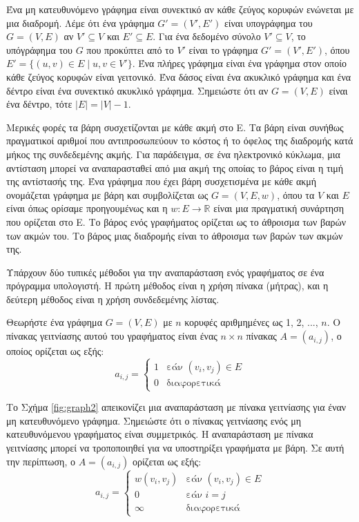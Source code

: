 \documentclass[12pt,a4paper]{article} %
\begin{document}
Ένα μη κατευθυνόμενο γράφημα είναι συνεκτικό αν κάθε ζεύγος κορυφών ενώνεται με μια διαδρομή. Λέμε ότι ένα γράφημα $G' = (V', E')$ είναι υπογράφημα του $G = (V, E)$ αν $V'\subseteq V$ και $E'\subseteq E$. Για ένα δεδομένο σύνολο $V'\subseteq V$, το υπόγράφημα του $G$ που προκύπτει από το $V'$ είναι το γράφημα $G' = (V', E')$, όπου $E' = \{ (u, v) \in E \mid u, v \in V' \}$. Ένα πλήρες γράφημα είναι ένα γράφημα στον οποίο κάθε ζεύγος κορυφών είναι γειτονικό. Ένα δάσος είναι ένα ακυκλικό γράφημα και ένα δέντρο είναι ένα συνεκτικό ακυκλικό γράφημα. Σημειώστε ότι αν $G = (V, E)$ είναι ένα δέντρο, τότε $|E| = |V| - 1$.

Μερικές φορές τα βάρη συσχετίζονται με κάθε ακμή στο Ε. Τα βάρη είναι συνήθως πραγματικοί αριθμοί που αντιπροσωπεύουν το κόστος ή το όφελος της διαδρομής κατά μήκος της συνδεδεμένης ακμής. Για παράδειγμα, σε ένα ηλεκτρονικό κύκλωμα, μια αντίσταση μπορεί να αναπαρασταθεί από μια ακμή της οποίας το βάρος είναι η τιμή της  αντίστασής της. Ένα γράφημα που έχει βάρη συσχετισμένα με κάθε ακμή ονομάζεται γράφημα με βάρη και συμβολίζεται ως $G = (V, E, w)$, όπου τα $V$ και $E$ είναι όπως ορίσαμε προηγουμένως και η $w : E \to \mathbb{R}$ είναι μια πραγματική συνάρτηση που ορίζεται στο E. Το βάρος ενός γραφήματος ορίζεται ως το άθροισμα των βαρών των ακμών του. Το βάρος μιας διαδρομής είναι το άθροισμα των βαρών των ακμών της.

Υπάρχουν δύο τυπικές μέθοδοι για την αναπαράσταση ενός γραφήματος σε ένα πρόγραμμα υπολογιστή. Η πρώτη μέθοδος είναι η χρήση πίνακα (μήτρας), και η δεύτερη μέθοδος είναι η χρήση συνδεδεμένης λίστας.

Θεωρήστε ένα γράφημα $G = (V, E)$ με $n$ κορυφές αριθμημένες ως 1, 2, ..., $n$. Ο πίνακας γειτνίασης αυτού του γραφήματος είναι ένας $n \times n$ πίνακας $A = (a_{i,j})$, ο οποίος ορίζεται ως εξής: \[
a_{i,j} =
\begin{cases}
1 & \text{εάν } (v_i, v_j) \in E\\[2mm]
0 & \text{διαφορετικά}
\end{cases}
\]

Το Σχήμα \ref{fig:graph2} απεικονίζει μια αναπαράσταση με πίνακα γειτνίασης για έναν μη κατευθυνόμενο γράφημα. Σημειώστε ότι ο πίνακας γειτνίασης ενός μη κατευθυνόμενου γραφήματος είναι συμμετρικός. Η αναπαράσταση με πίνακα γειτνίασης μπορεί να τροποποιηθεί για να υποστηρίξει γραφήματα με βάρη. Σε αυτή την περίπτωση, ο $A = (a_{i,j})$ ορίζεται ως εξής:
\[
a_{i,j} =
\begin{cases}
w(v_i, v_j) & \text{εάν } (v_i, v_j) \in E\\[2mm]
0 & \text{εάν } i = j\\[2mm]
\infty & \text{διαφορετικά}
\end{cases}
\]
\end{document}
